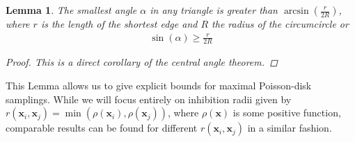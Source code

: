 \documentclass[preprint, 10pt]{elsarticle}
\newcommand{\vx}{{\mathbf x}}
\newtheorem{lemma}[theorem]{Lemma}
\theoremstyle{definition}
\theoremstyle{remark}
\begin{document}
\begin{lemma}
	\label{lemma:angle2d}
The smallest angle $\alpha$ in any triangle is greater than $\arcsin\left(\frac{r}{2R}\right)$, where $r$ is the length of the shortest edge and $R$ the radius of the circumcircle or \begin{align}
	\sin(\alpha)\ge \frac{r}{2R} \label{eq:smallest angle}
\end{align}
	\begin{proof}
		This is a direct corollary of the central angle theorem.
	\end{proof}
\end{lemma}
This Lemma allows us to give explicit bounds for maximal Poisson-disk samplings.
While we will focus entirely on inhibition radii given by $r(\vx_i,\vx_j)=\min(\rho(\vx_i),\rho(\vx_j))$, where $\rho(\vx)$ is some positive function, comparable results can be found for different $r(\vx_i,\vx_j)$ in a similar fashion. 
\end{document}
